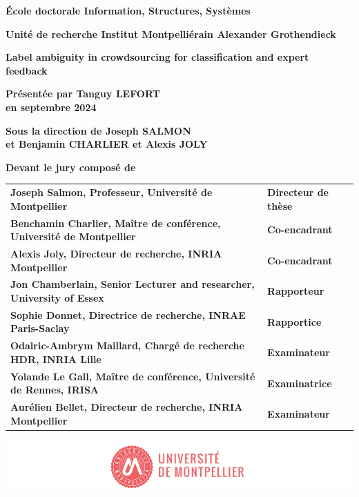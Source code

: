 \documentclass[
a4paper, %
12pt]{book}
\begin{document}
\begin{titlepage}
{\bigskip
\textbf{École doctorale Information, Structures, Systèmes}

\bigskip
\textbf{Unité de recherche Institut Montpelliérain Alexander Grothendieck}


\color{Titleblue}
\fontsize{17}{20.4}\selectfont
\vspace{2cm}
\textbf{Label ambiguity in crowdsourcing for classification and
expert feedback}


\vspace{4cm}
\fontsize{15}{18}\selectfont
\color{black}
\textbf{Présentée par Tanguy LEFORT\\
en septembre 2024}

\bigskip
\fontsize{13}{15.6}\selectfont
\textbf{Sous la direction de Joseph SALMON\\
et Benjamin CHARLIER et Alexis JOLY}

\vspace{1.5cm}
\normalsize
\textbf{Devant le jury composé de}\\
\bigskip
\fontsize{10}{12}\selectfont
\vspace{1.5mm}
\begin{tabular}{p{14cm}l}
\textbf{Joseph Salmon, Professeur, Université de Montpellier} & \textbf{Directeur de thèse} \\
\textbf{Benchamin Charlier, Maître de conférence, Université de Montpellier} & \textbf{Co-encadrant} \\
\textbf{Alexis Joly, Directeur de recherche, INRIA Montpellier} & \textbf{Co-encadrant} \\
\textbf{Jon Chamberlain, Senior Lecturer and researcher, University of Essex} & \textbf{Rapporteur} \\
\textbf{Sophie Donnet, Directrice de recherche, INRAE Paris-Saclay} & \textbf{Rapportice} \\
\textbf{Odalric-Ambrym Maillard, Chargé de recherche HDR, INRIA Lille} & \textbf{Examinateur} \\
\textbf{Yolande Le Gall, Maître de conférence, Université de Rennes, IRISA} & \textbf{Examinatrice} \\
\textbf{Aurélien Bellet, Directeur de recherche, INRIA Montpellier} & \textbf{Examinateur} \\

\end{tabular}

\vspace{\fill}
\includegraphics[scale=1]{images/PhD_Couverture_LogoUM.png}
\vspace{-15mm}}
\end{titlepage}


% 
\end{document}

